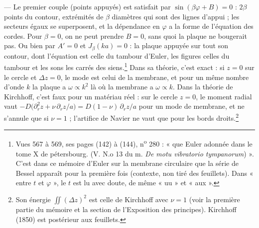 \documentclass[11pt,a4paper]{article}
\begin{document}
— Le premier couple (points appuyés) est satisfait par
$\sin(\beta\varphi+B) = 0$ : $2\beta$ points du contour, extrémités de
$\beta$ diamètres qui sont des lignes d'appui ; les secteurs égaux se superposent,
et la dépendance en $\varphi$ a la forme de l'équation des cordes. Pour
$\beta = 0$, on ne peut prendre $B = 0$, sans quoi la plaque ne bougerait pas.
Ou bien par $A' = 0$ et $J_\beta(ka) = 0$ : la plaque appuyée sur tout son
contour, dont l'équation est celle du tambour d'Euler, les figures celles du
tambour et les sons les carrés des siens.\footnote{Vues 567 à 569, ses pages
(142) à (144), n\textsuperscript{o} 280 : « que Euler adonnée dans le tome X de
pétersbourg. (V. N.o 13 du m. \emph{De motu vibratorio tympanorum}) ». C'est
dans ce mémoire d'Euler sur la membrane circulaire que la série de Bessel
apparaît pour la première fois (contexte, non tiré des feuillets). Dans « entre
$t$ et $\varphi$ », le $t$ est lu avec doute, de même « uu » et « aux ».}
Dans sa théorie, c'est exact : si $z = 0$ sur le cercle et $\Delta z = 0$, le
mode est celui de la membrane, et pour un même nombre d'onde $k$ la plaque a
$\omega\propto k^2$ là où la membrane a $\omega\propto k$. Dans la théorie de
Kirchhoff, c'est faux pour un matériau réel : sur le cercle $z = 0$, le moment
radial vaut $-D\bigl(\partial_r^2 z + \nu\,\partial_r z/a\bigr) =
D(1-\nu)\,\partial_r z/a$ pour un mode de membrane, et ne s'annule que si
$\nu = 1$ ; l'artifice de Navier ne vaut que pour les bords
droits.\footnote{Son énergie $\iint(\Delta z)^2$ est celle de Kirchhoff avec
$\nu = 1$ (voir la première partie du mémoire et la section de l'Exposition des
principes). Kirchhoff (1850) est postérieur aux feuillets.}
\end{document}
